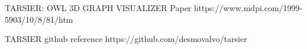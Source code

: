 
TARSIER: OWL 3D GRAPH VISUALIZER Paper
https://www.mdpi.com/1999-5903/10/8/81/htm

TARSIER github reference
https://github.com/desmovalvo/tarsier